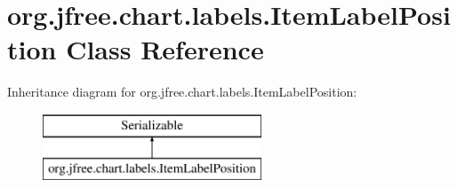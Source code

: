 \hypertarget{classorg_1_1jfree_1_1chart_1_1labels_1_1_item_label_position}{}\section{org.\+jfree.\+chart.\+labels.\+Item\+Label\+Position Class Reference}
\label{classorg_1_1jfree_1_1chart_1_1labels_1_1_item_label_position}
Inheritance diagram for org.\+jfree.\+chart.\+labels.\+Item\+Label\+Position\+:\begin{figure}[H]
\begin{center}
\leavevmode
\includegraphics[height=2.000000cm]{classorg_1_1jfree_1_1chart_1_1labels_1_1_item_label_position}
\end{center}
\end{figure}
